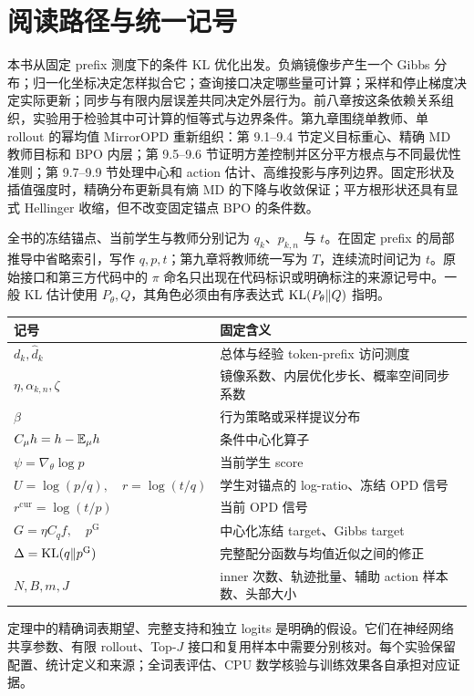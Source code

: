 \chapter*{阅读路径与统一记号}
本书从固定 prefix 测度下的条件 KL 优化出发。负熵镜像步产生一个 Gibbs 分布；归一化坐标决定怎样拟合它；查询接口决定哪些量可计算；采样和停止梯度决定实际更新；同步与有限内层误差共同决定外层行为。前八章按这条依赖关系组织，实验用于检验其中可计算的恒等式与边界条件。第九章围绕单教师、单 rollout 的幂均值 MirrorOPD 重新组织：第 9.1--9.4 节定义目标重心、精确 MD 教师目标和 BPO 内层；第 9.5--9.6 节证明方差控制并区分平方根点与不同最优性准则；第 9.7--9.9 节处理中心和 action 估计、高维投影与序列边界。固定形状及插值强度时，精确分布更新具有熵 MD 的下降与收敛保证；平方根形状还具有显式 Hellinger 收缩，但不改变固定锚点 BPO 的条件数。

全书的冻结锚点、当前学生与教师分别记为 $q_k$、$p_{k,n}$ 与 $t$。在固定 prefix 的局部推导中省略索引，写作 $q,p,t$；第九章将教师统一写为 $T$，连续流时间记为 $t$。原始接口和第三方代码中的 $\pi$ 命名只出现在代码标识或明确标注的来源记号中。一般 KL 估计使用 $P_\theta,Q$，其角色必须由有序表达式 $\operatorname{KL}(P_\theta\Vert Q)$ 指明。

\begin{center}
\begin{tabular}{ll}
\toprule
记号 & 固定含义\\
\midrule
$d_k,\widehat d_k$ & 总体与经验 token-prefix 访问测度\\
$\eta,\alpha_{k,n},\zeta$ & 镜像系数、内层优化步长、概率空间同步系数\\
$\beta$ & 行为策略或采样提议分布\\
$C_\mu h=h-\mathbb E_\mu h$ & 条件中心化算子\\
$\psi=\nabla_\theta\log p$ & 当前学生 score\\
$U=\log(p/q),\quad r=\log(t/q)$ & 学生对锚点的 log-ratio、冻结 OPD 信号\\
$r^{\mathrm{cur}}=\log(t/p)$ & 当前 OPD 信号\\
$G=\eta C_q f,\quad p^{\mathrm G}$ & 中心化冻结 target、Gibbs target\\
$\Delta=\operatorname{KL}(q\Vert p^{\mathrm G})$ & 完整配分函数与均值近似之间的修正\\
$N,B,m,J$ & inner 次数、轨迹批量、辅助 action 样本数、头部大小\\
\bottomrule
\end{tabular}
\end{center}

定理中的精确词表期望、完整支持和独立 logits 是明确的假设。它们在神经网络共享参数、有限 rollout、Top-$J$ 接口和复用样本中需要分别核对。每个实验保留配置、统计定义和来源；全词表评估、CPU 数学核验与训练效果各自承担对应证据。
